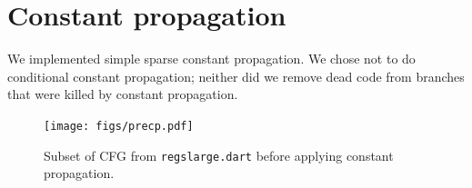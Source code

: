 \documentclass[10pt,twocolumn]{article}
\begin{document}
\section{Constant propagation}

We implemented simple sparse constant propagation. We chose not to do
conditional constant propagation; neither did we remove dead code from
branches that were killed by constant propagation.

\begin{figure}
\begin{center}
  \texttt{[image: figs/precp.pdf]}
\begin{minipage}{0.95\columnwidth}
  \caption{\label{fig:prevn} Subset of CFG from \texttt{regslarge.dart} before applying constant propagation.}
\end{minipage}
\end{center}
\end{figure}
\end{document}
